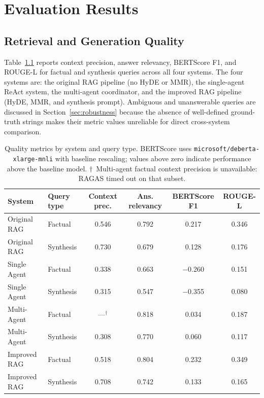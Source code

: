 
\chapter{Evaluation Results}
\label{ch:results}

\section{Retrieval and Generation Quality}
\label{sec:quality}

Table~\ref{tab:quality-main} reports context precision, answer relevancy, BERTScore F1, and ROUGE-L for factual and synthesis queries across all four systems. The four systems are: the original RAG pipeline (no HyDE or MMR), the single-agent ReAct system, the multi-agent coordinator, and the improved RAG pipeline (HyDE, MMR, and synthesis prompt). Ambiguous and unanswerable queries are discussed in Section~\ref{sec:robustness} because the absence of well-defined ground-truth strings makes their metric values unreliable for direct cross-system comparison.

\begin{table}[ht]
\centering
\small
\setlength{\tabcolsep}{4pt}
\caption{Quality metrics by system and query type. BERTScore uses \texttt{microsoft/deberta-xlarge-mnli} with baseline rescaling; values above zero indicate performance above the baseline model. $\dagger$~Multi-agent factual context precision is unavailable: RAGAS timed out on that subset.}
\label{tab:quality-main}
\begin{tabular}{llcccc}
\hline
\textbf{System} & \textbf{Query type} & \textbf{Context prec.} & \textbf{Ans. relevancy} & \textbf{BERTScore F1} & \textbf{ROUGE-L} \\
\hline
Original RAG & Factual   & 0.546 & 0.792 & 0.217  & 0.346 \\
Original RAG & Synthesis & 0.730 & 0.679 & 0.128  & 0.176 \\
Single Agent & Factual   & 0.338 & 0.663 & $-$0.260 & 0.151 \\
Single Agent & Synthesis & 0.315 & 0.547 & $-$0.355 & 0.080 \\
Multi-Agent  & Factual   & ---$^\dagger$ & 0.818 & 0.034  & 0.187 \\
Multi-Agent  & Synthesis & 0.308 & 0.770 & 0.060  & 0.117 \\
Improved RAG & Factual   & 0.518 & 0.804 & 0.232  & 0.349 \\
Improved RAG & Synthesis & 0.708 & 0.742 & 0.133  & 0.165 \\
\hline
\end{tabular}
\end{table}

